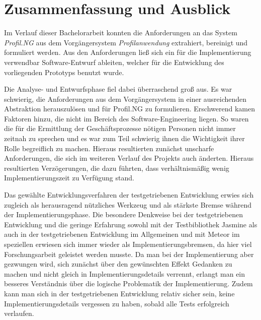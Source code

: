
\chapter{Zusammenfassung und Ausblick} %

\label{ch:zusammenfassungUndAusblick} %



Im Verlauf dieser Bachelorarbeit konnten die Anforderungen an das System
\textit{Profil.NG} aus dem Vorgängersystem \textit{Profilanwendung} extrahiert,
bereinigt und formuliert werden. Aus den Anforderungen  ließ sich ein für die
Implementierung verwendbar Software-Entwurf ableiten, welcher für die
Entwicklung des vorliegenden Prototyps benutzt wurde.

Die Analyse- und Entwurfsphase fiel dabei überraschend groß aus. Es war
schwierig, die Anforderungen aus dem Vorgängersystem in einer ausreichenden
Abstraktion herauszulösen und für Profil.NG zu formulieren. Erschwerend kamen
Faktoren hinzu, die nicht im Bereich des Software-Engineering liegen. So waren
die für die Ermittlung der Geschäftsprozesse nötigen Personen nicht immer
zeitnah zu sprechen und es war zum Teil schwierig ihnen die Wichtigkeit ihrer
Rolle begreiflich zu machen. Hieraus resultierten zunächst unscharfe
Anforderungen, die sich im weiteren Verlauf des Projekts auch änderten. Hieraus
resultierten Verzögerungen, die dazu führten, dass verhältnismäßig wenig
Implementierungszeit zu Verfügung stand.

Das gewählte Entwicklungsverfahren der testgetriebenen Entwicklung erwies sich
zugleich als herausragend nützliches Werkzeug und als stärkste Bremse während
der Implementierungsphase. Die besondere Denkweise bei der testgetriebenen
Entwicklung und die geringe Erfahrung sowohl mit der Testbibliothek Jasmine als
auch in der testgetriebenen Entwicklung im Allgemeinen und mit Meteor im
speziellen erwiesen sich immer wieder als Implementierungsbremsen, da hier viel
Forschungsarbeit geleistet werden musste. Da man bei der Implementierung aber
gezwungen wird, sich zunächst über den gewünschten Effekt Gedanken zu machen und
nicht gleich in Implementierungsdetails verrennt, erlangt man ein besseres
Verständnis über die logische Problematik der Implementierung. Zudem kann man
sich in der testgetriebenen Entwicklung relativ sicher sein, keine
Implementierungsdetails vergessen zu haben, sobald alle Tests erfolgreich
verlaufen.

